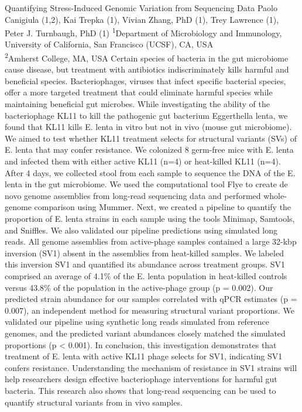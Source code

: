 \makeabstract
{
Quantifying Stress-Induced Genomic Variation from Sequencing Data
}
{
Paolo Canigiula (1,2), Kai Trepka (1), Vivian Zhang, PhD (1), Trey Lawrence (1), Peter J. Turnbaugh, PhD (1)
}
{
\textsuperscript{1}Department of Microbiology and Immunology, University of California, San Francisco (UCSF), CA, USA\\
\textsuperscript{2}Amherst College, MA, USA
}
{
Certain species of bacteria in the gut microbiome cause disease, but treatment with antibiotics indiscriminately kills harmful and beneficial species. Bacteriophages, viruses that infect specific bacterial species, offer a more targeted treatment that could eliminate harmful species while maintaining beneficial gut microbes. While investigating the ability of the bacteriophage KL11 to kill the pathogenic gut bacterium Eggerthella lenta, we found that KL11 kills E. lenta in vitro but not in vivo (mouse gut microbiome). We aimed to test whether KL11 treatment selects for structural variants (SVs) of E. lenta that may confer resistance.
}
{
We colonized 8 germ-free mice with E. lenta and infected them with either active KL11 (n=4) or heat-killed KL11 (n=4). After 4 days, we collected stool from each sample to sequence the DNA of the E. lenta in the gut microbiome. We used the computational tool Flye to create de novo genome assemblies from long-read sequencing data and performed whole-genome comparison using Mummer. Next, we created a pipeline to quantify the proportion of E. lenta strains in each sample using the tools Minimap, Samtools, and Sniffles. We also validated our pipeline predictions using simulated long reads.
}
{
All genome assemblies from active-phage samples contained a large 32-kbp inversion (SV1) absent in the assemblies from heat-killed samples. We labeled this inversion SV1 and quantified its abundance across treatment groups. SV1 comprised an average of 4.1\% of the E. lenta population in heat-killed controls versus 43.8\% of the population in the active-phage group (p = 0.002). Our predicted strain abundance for our samples correlated with qPCR estimates (p = 0.007), an independent method for measuring structural variant proportions. We validated our pipeline using synthetic long reads simulated from reference genomes, and the predicted variant abundances closely matched the simulated proportions (p < 0.001).
}
{
In conclusion, this investigation demonstrates that treatment of E. lenta with active KL11 phage selects for SV1, indicating SV1 confers resistance. Understanding the mechanism of resistance in SV1 strains will help researchers design effective bacteriophage interventions for harmful gut bacteria. This research also shows that long-read sequencing can be used to quantify structural variants from in vivo samples.
}

\newpage
